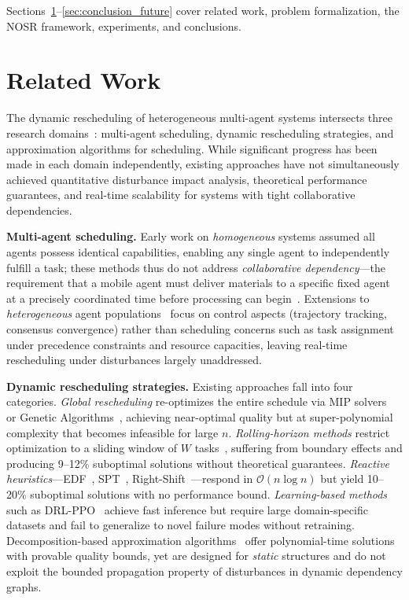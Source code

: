 \documentclass[manuscript,screen,review]{acmart}
\begin{document}
Sections~\ref{sec:related_work}--\ref{sec:conclusion_future} cover related work,
problem formalization, the NOSR framework, experiments, and conclusions.

\section{Related Work}
\label{sec:related_work}

The dynamic rescheduling of heterogeneous multi-agent systems intersects three
research domains~\cite{icarte2024learning}: multi-agent scheduling, dynamic
rescheduling strategies, and approximation algorithms for scheduling. While
significant progress has been made in each domain independently, existing
approaches have not simultaneously achieved quantitative disturbance impact
analysis, theoretical performance guarantees, and real-time scalability for
systems with tight collaborative dependencies.

\textbf{Multi-agent scheduling.} Early work on \textit{homogeneous} systems assumed all agents possess identical
capabilities, enabling any single agent to independently fulfill a task; these
methods thus do not address \textit{collaborative dependency}---the requirement
that a mobile agent must deliver materials to a specific fixed agent at a
precisely coordinated time before processing can begin~\cite{karabegovic2015application}.
Extensions to \textit{heterogeneous} agent populations~\cite{shi2021social} focus on control aspects (trajectory tracking, consensus
convergence) rather than scheduling concerns such as task assignment under
precedence constraints and resource capacities, leaving real-time rescheduling
under disturbances largely unaddressed.

\textbf{Dynamic rescheduling strategies.}
Existing approaches fall into four categories.
\textit{Global rescheduling} re-optimizes the entire schedule via MIP
solvers~\cite{tumanov2016tetrisched} or Genetic
Algorithms~\cite{anwaar2022genetic}, achieving near-optimal quality but
at super-polynomial complexity that becomes infeasible for large $n$.
\textit{Rolling-horizon methods} restrict optimization to a sliding
window of $W$ tasks~\cite{zeitrag2025novel}, suffering from boundary
effects and producing 9--12\% suboptimal solutions without theoretical
guarantees.
\textit{Reactive heuristics}---EDF~\cite{pathan2016design},
SPT~\cite{dell2019scheduling}, Right-Shift~\cite{vieira2003rescheduling}---respond
in $\mathcal{O}(n \log n)$ but yield 10--20\% suboptimal solutions with
no performance bound.
\textit{Learning-based methods} such as DRL-PPO~\cite{maliah2022computing,
elumalai2025proximal} achieve fast inference but require large
domain-specific datasets and fail to generalize to novel failure modes
without retraining.
Decomposition-based approximation algorithms~\cite{fan2022joint} offer
polynomial-time solutions with provable quality bounds, yet are designed
for \textit{static} structures and do not exploit the bounded propagation
property of disturbances in dynamic dependency graphs.
\end{document}
